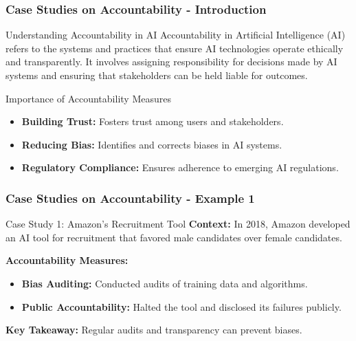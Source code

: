 \documentclass[aspectratio=169]{beamer}
\begin{document}
\begin{frame}[fragile]
    \frametitle{Case Studies on Accountability - Introduction}
    \begin{block}{Understanding Accountability in AI}
        Accountability in Artificial Intelligence (AI) refers to the systems and practices that ensure AI technologies operate ethically and transparently. It involves assigning responsibility for decisions made by AI systems and ensuring that stakeholders can be held liable for outcomes.
    \end{block}
    
    \begin{block}{Importance of Accountability Measures}
        \begin{itemize}
            \item \textbf{Building Trust:} Fosters trust among users and stakeholders.
            \item \textbf{Reducing Bias:} Identifies and corrects biases in AI systems.
            \item \textbf{Regulatory Compliance:} Ensures adherence to emerging AI regulations.
        \end{itemize}
    \end{block}
\end{frame}

\begin{frame}[fragile]
    \frametitle{Case Studies on Accountability - Example 1}
    \begin{block}{Case Study 1: Amazon's Recruitment Tool}
        \textbf{Context:} In 2018, Amazon developed an AI tool for recruitment that favored male candidates over female candidates.
        
        \textbf{Accountability Measures:}
        \begin{itemize}
            \item \textbf{Bias Auditing:} Conducted audits of training data and algorithms.
            \item \textbf{Public Accountability:} Halted the tool and disclosed its failures publicly.
        \end{itemize}
        
        \textbf{Key Takeaway:} Regular audits and transparency can prevent biases.
    \end{block}
\end{frame}
\end{document}
